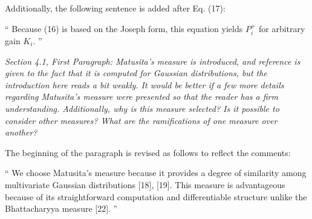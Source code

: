 \documentclass[11pt]{article}
\newenvironment{correction}{\begin{list}{}{\setlength{\leftmargin}{1cm}\setlength{\rightmargin}{1cm}}\vspace{\parsep}\item[]``}{''\end{list}}
\begin{document}
\begin{itemize}
%

Additionally, the following sentence is added after Eq. (17):

\begin{correction}
Because (16) is based on the Joseph form, this equation yields $P^+_i$ for arbitrary gain $K_i$.
\end{correction}

%

\item {\itshape Section 4.1, First Paragraph:
Matusita's measure is introduced, and reference is given to the fact that it is computed for Gaussian distributions, but the introduction here reads a bit weakly.  It would be better if a few more details regarding Matusita's measure were presented so that the reader has a firm understanding.  Additionally, why is this measure selected?  Is it possible to consider other measures?  What are the ramifications of one measure over another?}

The beginning of the paragraph is revised as follows to reflect the comments:

\begin{correction}
We choose Matusita's measure because it provides a degree of similarity among multivariate Gaussian distributions [18], [19]. 
This measure is advantageous because of its straightforward computation and differentiable structure unlike the Bhattacharyya measure [22].
\end{correction}


\end{itemize}
\end{document}
